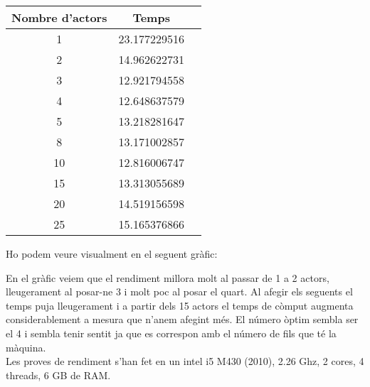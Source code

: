 \documentclass{report}
\begin{document}
\begin{center}
\begin{tabular}{| c | c | c |}
\hline
Nombre d'actors  & Temps \\ \hline
1  & 23.177229516 \\ \hline
2  & 14.962622731 \\ \hline
3  & 12.921794558 \\ \hline
4  & 12.648637579 \\ \hline
5  & 13.218281647 \\ \hline
8  & 13.171002857 \\ \hline
10 & 12.816006747 \\ \hline
15 & 13.313055689 \\ \hline
20 & 14.519156598 \\ \hline
25 & 15.165376866 \\
\hline
\end{tabular}
\end{center}

Ho podem veure visualment en el seguent gràfic:

\begin{center}
\end{center}

En el gràfic veiem que el rendiment millora molt al passar de 1 a 2 actors, lleugerament al posar-ne 3 i molt poc al posar el quart.
Al afegir els seguents el temps puja lleugerament i a partir dels 15 actors el temps de còmput augmenta considerablement a mesura que n'anem afegint més. El número òptim sembla ser el 4 i sembla tenir sentit ja que es correspon amb el número de fils que té la màquina. \\

Les proves de rendiment s'han fet en un intel i5 M430 (2010), 2.26 Ghz, 2 cores, 4 threads, 6 GB de RAM.
\end{document}
